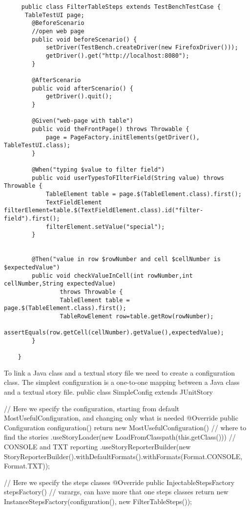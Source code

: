  	\lstset{language=Java}
  	\begin{lstlisting}
	 public class FilterTableSteps extends TestBenchTestCase {
	  TableTestUI page;
	    @BeforeScenario
	    //open web page
	    public void beforeScenario() {
	        setDriver(TestBench.createDriver(new FirefoxDriver()));
	        getDriver().get("http://localhost:8080");
	    }
	
	    @AfterScenario
	    public void afterScenario() {
	        getDriver().quit();
	    }
	
	    @Given("web-page with table")
	    public void theFrontPage() throws Throwable {
	        page = PageFactory.initElements(getDriver(), TableTestUI.class);
	    }
	
	    @When("typing $value to filter field")
	    public void userTypesToFIlterField(String value) throws Throwable {
	        TableElement table = page.$(TableElement.class).first();
			TextFieldElement filterElement=table.$(TextFieldElement.class).id("filter-field").first();
			filterElement.setValue("special");
	    }
	
	
	    @Then("value in row $rowNumber and cell $cellNumber is $expectedValue")
	    public void checkValueInCell(int rowNumber,int cellNumber,String expectedValue)
	            throws Throwable {
	            TableElement table = page.$(TableElement.class).first();
				TableRowElement row=table.getRow(rowNumber);
				assertEquals(row.getCell(cellNumber).getValue(),expectedValue);
	    }
	
	}
\end{lstlisting}
To link a Java class and a textual story file we need to create a configuration class.
The simplest configuration is a one-to-one mapping between a Java class and a textual story file. 
public class SimpleConfig extends JUnitStory {
 
    // Here we specify the configuration, starting from default MostUsefulConfiguration, and changing only what is needed
    @Override
    public Configuration configuration() {
        return new MostUsefulConfiguration()
            // where to find the stories
            .useStoryLoader(new LoadFromClasspath(this.getClass())) 
            // CONSOLE and TXT reporting
            .useStoryReporterBuilder(new StoryReporterBuilder().withDefaultFormats().withFormats(Format.CONSOLE, Format.TXT));
    }
 
    // Here we specify the steps classes
    @Override
    public InjectableStepsFactory stepsFactory() {    	
        // varargs, can have more that one steps classes
        return new InstanceStepsFactory(configuration(), new FilterTableSteps());
    }
}


